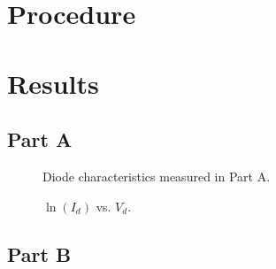 \documentclass{article}
\begin{document}
\section{Procedure}
\label{sec:procedure}

%
%

\section{Results}
\label{sec:results}

\subsection{Part A}
\label{sec:result_a}

\begin{figure}[hbtp]
  \begin{center}
    
  \end{center}
  \caption{\label{fig:part_a_graph} Diode characteristics measured in Part A.}
\end{figure}

\begin{figure}[hbtp]
  \begin{center}
    
  \end{center}
  \caption{\label{fig:part_a_graph2} $\ln{(I_d)}$ vs. $V_d$.}
\end{figure}

\subsection{Part B}
\label{sec:result_b}
\end{document}
